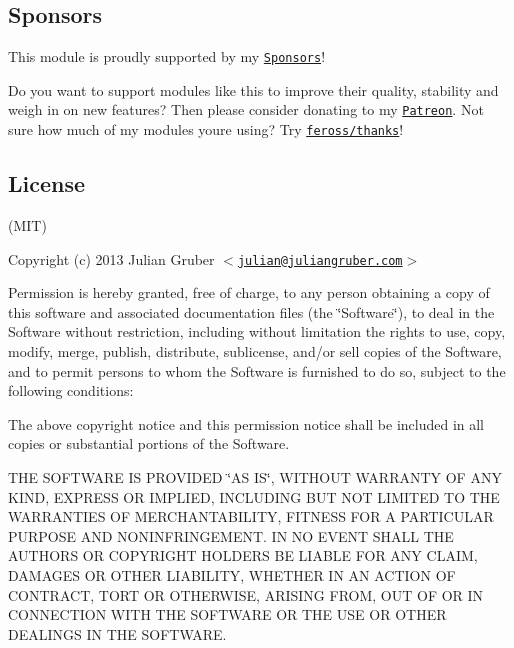 \subsection*{Sponsors}

This module is proudly supported by my \href{https://github.com/juliangruber/sponsors}{\tt Sponsors}!

Do you want to support modules like this to improve their quality, stability and weigh in on new features? Then please consider donating to my \href{https://www.patreon.com/juliangruber}{\tt Patreon}. Not sure how much of my modules you\textquotesingle{}re using? Try \href{https://github.com/feross/thanks}{\tt feross/thanks}!

\subsection*{License}

(M\+IT)

Copyright (c) 2013 Julian Gruber $<$\href{mailto:julian@juliangruber.com}{\tt julian@juliangruber.\+com}$>$

Permission is hereby granted, free of charge, to any person obtaining a copy of this software and associated documentation files (the \char`\"{}\+Software\char`\"{}), to deal in the Software without restriction, including without limitation the rights to use, copy, modify, merge, publish, distribute, sublicense, and/or sell copies of the Software, and to permit persons to whom the Software is furnished to do so, subject to the following conditions\+:

The above copyright notice and this permission notice shall be included in all copies or substantial portions of the Software.

T\+HE S\+O\+F\+T\+W\+A\+RE IS P\+R\+O\+V\+I\+D\+ED \char`\"{}\+A\+S I\+S\char`\"{}, W\+I\+T\+H\+O\+UT W\+A\+R\+R\+A\+N\+TY OF A\+NY K\+I\+ND, E\+X\+P\+R\+E\+SS OR I\+M\+P\+L\+I\+ED, I\+N\+C\+L\+U\+D\+I\+NG B\+UT N\+OT L\+I\+M\+I\+T\+ED TO T\+HE W\+A\+R\+R\+A\+N\+T\+I\+ES OF M\+E\+R\+C\+H\+A\+N\+T\+A\+B\+I\+L\+I\+TY, F\+I\+T\+N\+E\+SS F\+OR A P\+A\+R\+T\+I\+C\+U\+L\+AR P\+U\+R\+P\+O\+SE A\+ND N\+O\+N\+I\+N\+F\+R\+I\+N\+G\+E\+M\+E\+NT. IN NO E\+V\+E\+NT S\+H\+A\+LL T\+HE A\+U\+T\+H\+O\+RS OR C\+O\+P\+Y\+R\+I\+G\+HT H\+O\+L\+D\+E\+RS BE L\+I\+A\+B\+LE F\+OR A\+NY C\+L\+A\+IM, D\+A\+M\+A\+G\+ES OR O\+T\+H\+ER L\+I\+A\+B\+I\+L\+I\+TY, W\+H\+E\+T\+H\+ER IN AN A\+C\+T\+I\+ON OF C\+O\+N\+T\+R\+A\+CT, T\+O\+RT OR O\+T\+H\+E\+R\+W\+I\+SE, A\+R\+I\+S\+I\+NG F\+R\+OM, O\+UT OF OR IN C\+O\+N\+N\+E\+C\+T\+I\+ON W\+I\+TH T\+HE S\+O\+F\+T\+W\+A\+RE OR T\+HE U\+SE OR O\+T\+H\+ER D\+E\+A\+L\+I\+N\+GS IN T\+HE S\+O\+F\+T\+W\+A\+RE. 